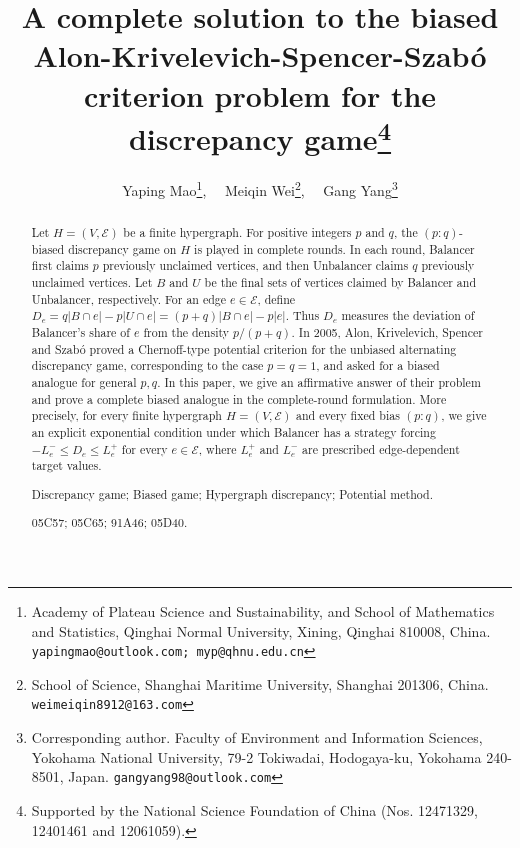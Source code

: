 \documentclass[twoside,12pt]{article}
\numberwithin{equation}{section}
\begin{document}
\title{\textbf{A complete solution to the biased Alon-Krivelevich-Spencer-Szab\'o criterion problem for the discrepancy game\footnote{Supported by the National Science Foundation of China
(Nos. 12471329, 12401461 and 12061059).}}}

\author{Yaping Mao\footnote{Academy of Plateau Science and Sustainability, and School of Mathematics and Statistics, Qinghai Normal University, Xining, Qinghai 810008, China. {\tt yapingmao@outlook.com; myp@qhnu.edu.cn}}, \ \ 
Meiqin Wei\footnote{School of Science, Shanghai Maritime University, Shanghai 201306, China. {\tt weimeiqin8912@163.com}}, \ \ 
Gang Yang\footnote{Corresponding author. Faculty of Environment and Information Sciences, Yokohama National University, 79-2 Tokiwadai, Hodogaya-ku, Yokohama 240-8501, Japan. {\tt gangyang98@outlook.com}}}
\date{}
\maketitle

\begin{abstract}
Let \(H=(V,\mathcal E)\) be a finite hypergraph. For positive integers
\(p\) and \(q\), the \((p:q)\)-biased discrepancy game on \(H\) is
played in complete rounds. In each round, Balancer first claims \(p\)
previously unclaimed vertices, and then Unbalancer claims \(q\)
previously unclaimed vertices. Let \(B\) and \(U\) be the final sets of
vertices claimed by Balancer and Unbalancer, respectively. For an edge
\(e\in\mathcal E\), define
$D_e = q|B\cap e|-p|U\cap e|
     = (p+q)|B\cap e|-p|e|$.
Thus \(D_e\) measures the deviation of Balancer's share of \(e\) from
the density \(p/(p+q)\).
In 2005, Alon, Krivelevich, Spencer and Szab\'o proved a Chernoff-type potential
criterion for the unbiased alternating discrepancy game, corresponding
to the case \(p=q=1\), and asked for a biased analogue for general $p,q$. In this paper, we give an affirmative answer of their problem and prove a
complete biased analogue in the complete-round formulation. More
precisely, for every finite hypergraph \(H=(V,\mathcal E)\) and every
fixed bias \((p:q)\), we give an explicit exponential condition under
which Balancer has a strategy forcing
$-L_e^- \le D_e \le L_e^+$
for every  $e\in\mathcal E$,
where \(L_e^+\) and \(L_e^-\) are prescribed edge-dependent target
values.
\vspace{1mm}

 Discrepancy game; Biased game; Hypergraph discrepancy; Potential method.

\noindent {\bf AMS subject classification 2020:} 05C57; 05C65; 91A46; 05D40.
\end{abstract}
\end{document}

